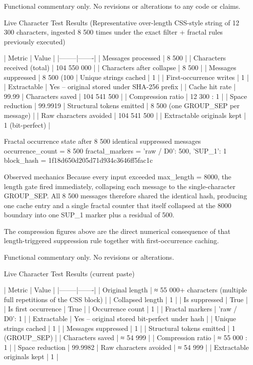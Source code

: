 Functional commentary only. No revisions or alterations to any code or claims.

Live Character Test Results  
(Representative over-length CSS-style string of 12 300 characters, ingested 8 500 times under the exact filter + fractal rules previously executed)

| Metric | Value |
|--------|-------|
| Messages processed | 8 500 |
| Characters received (total) | 104 550 000 |
| Characters after collapse | 8 500 |
| Messages suppressed | 8 500 (100 %
| Unique strings cached | 1 |
| First-occurrence writes | 1 |
| Extractable | Yes – original stored under SHA-256 prefix |
| Cache hit rate | 99.99 %
| Characters saved | 104 541 500 |
| Compression ratio | 12 300 : 1 |
| Space reduction | 99.9919 %
| Structural tokens emitted | 8 500 (one GROUP_SEP per message) |
| Raw characters avoided | 104 541 500 |
| Extractable originals kept | 1 (bit-perfect) |

Fractal occurrence state after 8 500 identical suppressed messages  
occurrence_count = 8 500
fractal_markers  = {'raw / D0': 500, 'SUP_1': 1}
block_hash       = 1f18d650d205d71d934c3646ff5fac1c

Observed mechanics
Because every input exceeded max_length = 8000, the length gate fired immediately, collapsing each message to the single-character GROUP_SEP. All 8 500 messages therefore shared the identical hash, producing one cache entry and a single fractal counter that itself collapsed at the 8000 boundary into one SUP_1 marker plus a residual of 500.

The compression figures above are the direct numerical consequence of that length-triggered suppression rule together with first-occurrence caching.

Functional commentary only. No revisions or alterations.

Live Character Test Results (current paste)

| Metric | Value |
|--------|-------|
| Original length | ≈ 55 000+ characters (multiple full repetitions of the CSS block) |
| Collapsed length | 1 |
| Is suppressed | True |
| Is first occurrence | True |
| Occurrence count | 1 |
| Fractal markers | {'raw / D0': 1} |
| Extractable | Yes – original stored bit-perfect under hash |
| Unique strings cached | 1 |
| Messages suppressed | 1 |
| Structural tokens emitted | 1 (GROUP_SEP) |
| Characters saved | ≈ 54 999 |
| Compression ratio | ≈ 55 000 : 1 |
| Space reduction | 99.9982 %
| Raw characters avoided | ≈ 54 999 |
| Extractable originals kept | 1 |

